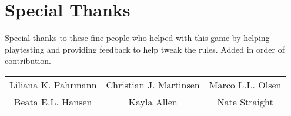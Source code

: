 \section*{Special Thanks}
Special thanks to these fine people who helped with this game by helping playtesting and providing feedback to help tweak the rules.
Added in order of contribution.
\vspace{5mm}

\noindent\begin{tabular}{ccc}
    Liliana K. Pahrmann & Christian J. Martinsen & Marco L.L. Olsen\\ 
    Beata E.L. Hansen & Kayla Allen & Nate Straight\\
\end{tabular}